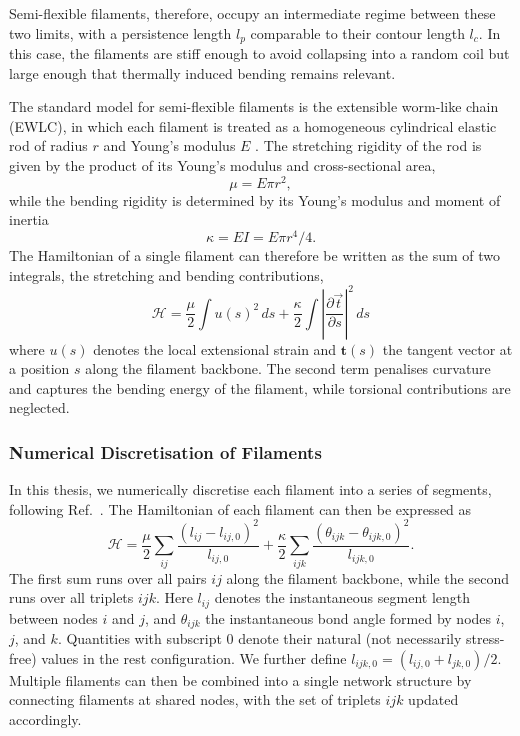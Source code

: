 \documentclass[asymmetricmargins]{library/duthesis}%
\begin{document}
Semi-flexible filaments, therefore, occupy an intermediate regime between these two limits, with a persistence length $l_p$ comparable to their contour length $l_c$. In this case, the filaments are stiff enough to avoid collapsing into a random coil but large enough that thermally induced bending remains relevant. 

The standard model for semi-flexible filaments is the extensible worm-like chain (EWLC), in which each filament is treated as a homogeneous cylindrical elastic rod of radius $r$ and Young's modulus $E$ \cite{doi_theory_1988}. The stretching rigidity of the rod is given by the product of its Young's modulus and cross-sectional area,
\[
    \mu = E \pi r^2,
\]
while the bending rigidity is determined by its Young's modulus and moment of inertia
\[
    \kappa = E I = E \pi r^4 / 4.
\]
The Hamiltonian of a single filament can therefore be written as the sum of two integrals, the stretching and bending contributions,
\begin{equation*}
    \mathcal{H} = \frac{\mu}{2} \int u(s)^2 \, ds + \frac{\kappa}{2} \int \left| \frac{\partial \vec{t}}{\partial s} \right|^2 \, ds
\end{equation*}
where \(u(s)\) denotes the local extensional strain and \(\bm{t}(s)\) the tangent vector at a position $s$ along the filament backbone. The second term penalises curvature and captures the bending energy of the filament, while torsional contributions are neglected.

\subsubsection*{Numerical Discretisation of Filaments}

In this thesis, we numerically discretise each filament into a series of segments, following Ref.~\cite{mackintosh_elasticity_1995}. The Hamiltonian of each filament can then be expressed as
\begin{equation}
    \mathcal{H} = \frac{\mu}{2} \sum_{ij} \frac{( l_{ij} - l_{ij,0} )^2}{l_{ij,0}} + \frac{\kappa}{2} \sum_{ijk} \frac{( \theta_{ijk} - \theta_{ijk,0} )^2}{l_{ijk,0}}.
    \label{eq:NetworkHamiltonian}
\end{equation}
The first sum runs over all pairs $ij$ along the filament backbone, while the second runs over all triplets $ijk$. Here $l_{ij}$ denotes the instantaneous segment length between nodes $i$ and $j$, and $\theta_{ijk}$ the instantaneous bond angle formed by nodes $i$, $j$, and $k$. Quantities with subscript $0$ denote their natural (not necessarily stress-free) values in the rest configuration. We further define $l_{ijk,0} = (l_{ij,0} + l_{jk,0})/2$. Multiple filaments can then be combined into a single network structure by connecting filaments at shared nodes, with the set of triplets $ijk$ updated accordingly. 
\end{document}
